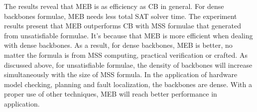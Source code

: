 



The results reveal that MEB is as efficiency as CB in general. For dense backbones formulae, MEB needs less total SAT solver time. The experiment results present that MEB outperforms CB with MSS formulae that generated from unsatisfiable formulae. It's because that MEB is more efficient when dealing with dense backbones. As a result, for dense backbones, MEB is better, no matter the formula is from MSS computing, practical verification or crafted.
As discussed above, for unsatisfiable formulae, the density of backbones will increase simultaneously with the size of MSS formula. In the application of hardware model checking, planning and fault localization, the backbones are dense. With a proper use of other techniques, MEB will reach better performance in application.




